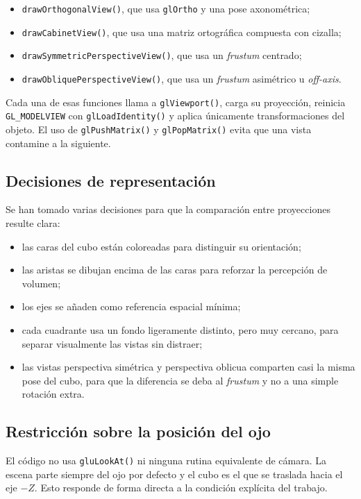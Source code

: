 \documentclass[12pt,a4paper]{article}
\begin{document}
\begin{itemize}[leftmargin=*]
    \item \texttt{drawOrthogonalView()}, que usa \texttt{glOrtho} y una pose axonométrica;
    \item \texttt{drawCabinetView()}, que usa una matriz ortográfica compuesta con cizalla;
    \item \texttt{drawSymmetricPerspectiveView()}, que usa un \emph{frustum} centrado;
    \item \texttt{drawObliquePerspectiveView()}, que usa un \emph{frustum} asimétrico u \emph{off-axis}.
\end{itemize}

Cada una de esas funciones llama a \texttt{glViewport()}, carga su proyección, reinicia \texttt{GL\_MODELVIEW} con \texttt{glLoadIdentity()} y aplica únicamente transformaciones del objeto. El uso de \texttt{glPushMatrix()} y \texttt{glPopMatrix()} evita que una vista contamine a la siguiente.

\subsection{Decisiones de representación}
Se han tomado varias decisiones para que la comparación entre proyecciones resulte clara:

\begin{itemize}[leftmargin=*]
    \item las caras del cubo están coloreadas para distinguir su orientación;
    \item las aristas se dibujan encima de las caras para reforzar la percepción de volumen;
    \item los ejes se añaden como referencia espacial mínima;
    \item cada cuadrante usa un fondo ligeramente distinto, pero muy cercano, para separar visualmente las vistas sin distraer;
    \item las vistas perspectiva simétrica y perspectiva oblicua comparten casi la misma pose del cubo, para que la diferencia se deba al \emph{frustum} y no a una simple rotación extra.
\end{itemize}

\subsection{Restricción sobre la posición del ojo}
El código no usa \texttt{gluLookAt()} ni ninguna rutina equivalente de cámara. La escena parte siempre del ojo por defecto y el cubo es el que se traslada hacia el eje $-Z$. Esto responde de forma directa a la condición explícita del trabajo.
\end{document}

